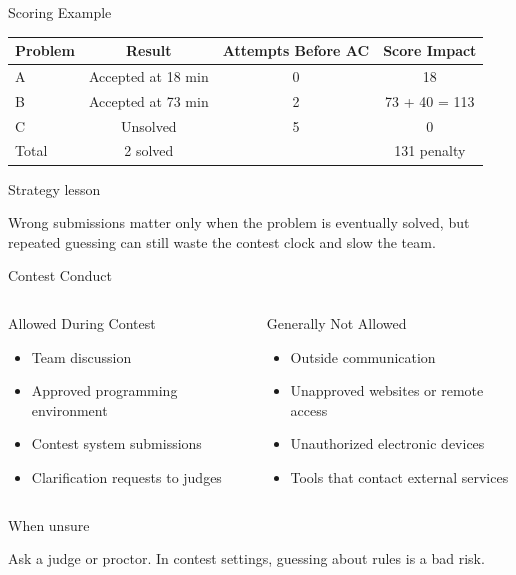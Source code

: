 \documentclass[aspectratio=169,11pt]{beamer}
\newenvironment{cpbox}[1]{%
  \begin{block}{#1}
  }{%
  \end{block}
}
\begin{document}
\begin{frame}{Scoring Example}
  \begin{center}
  \small
  \begin{tabular}{@{}lccc@{}}
    \toprule
    Problem & Result & Attempts Before AC & Score Impact \\
    \midrule
    A & Accepted at 18 min & 0 & 18 \\
    B & Accepted at 73 min & 2 & 73 + 40 = 113 \\
    C & Unsolved & 5 & 0 \\
    \midrule
    Total & 2 solved & & 131 penalty \\
    \bottomrule
  \end{tabular}
  \end{center}

  \vspace{0.35cm}
  \begin{cpbox}{Strategy lesson}
    Wrong submissions matter only when the problem is eventually solved, but repeated guessing can still waste the contest clock and slow the team.
  \end{cpbox}
\end{frame}

\begin{frame}{Contest Conduct}
  \begin{columns}[T,onlytextwidth]
      \begin{cpbox}{Allowed During Contest}
        \begin{itemize}
          \item Team discussion
          \item Approved programming environment
          \item Contest system submissions
          \item Clarification requests to judges
        \end{itemize}
      \end{cpbox}

      \begin{cpbox}{Generally Not Allowed}
        \begin{itemize}
          \item Outside communication
          \item Unapproved websites or remote access
          \item Unauthorized electronic devices
          \item Tools that contact external services
        \end{itemize}
      \end{cpbox}
  \end{columns}

  \vspace{0.25cm}
  \begin{cpbox}{When unsure}
    Ask a judge or proctor. In contest settings, guessing about rules is a bad risk.
  \end{cpbox}
\end{frame}
\end{document}
